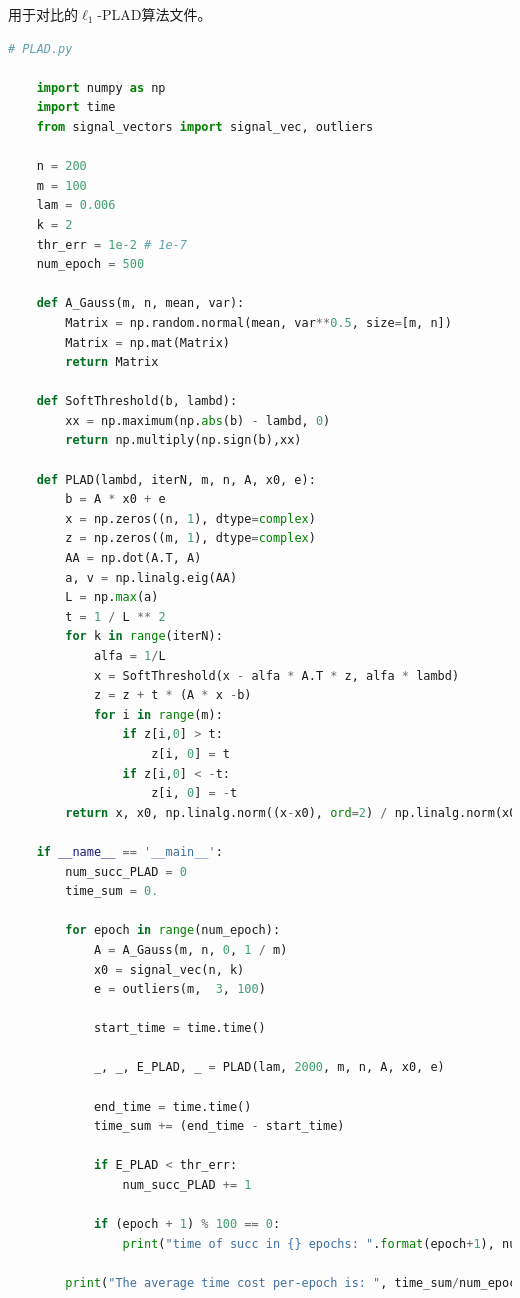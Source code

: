 \documentclass[AutoFakeBold]{LZUThesis}
\begin{document}
用于对比的$\ell_1$-PLAD算法文件。

\begin{lstlisting}[language = python]
    # PLAD.py

    import numpy as np
    import time
    from signal_vectors import signal_vec, outliers

    n = 200
    m = 100
    lam = 0.006
    k = 2
    thr_err = 1e-2 # 1e-7
    num_epoch = 500

    def A_Gauss(m, n, mean, var):
        Matrix = np.random.normal(mean, var**0.5, size=[m, n])
        Matrix = np.mat(Matrix)
        return Matrix

    def SoftThreshold(b, lambd):
        xx = np.maximum(np.abs(b) - lambd, 0)
        return np.multiply(np.sign(b),xx)

    def PLAD(lambd, iterN, m, n, A, x0, e):
        b = A * x0 + e
        x = np.zeros((n, 1), dtype=complex)
        z = np.zeros((m, 1), dtype=complex)
        AA = np.dot(A.T, A)
        a, v = np.linalg.eig(AA)
        L = np.max(a)
        t = 1 / L ** 2
        for k in range(iterN):
            alfa = 1/L
            x = SoftThreshold(x - alfa * A.T * z, alfa * lambd)
            z = z + t * (A * x -b)
            for i in range(m):
                if z[i,0] > t:
                    z[i, 0] = t
                if z[i,0] < -t:
                    z[i, 0] = -t
        return x, x0, np.linalg.norm((x-x0), ord=2) / np.linalg.norm(x0, ord=2), max(np.abs(A.T*e))

    if __name__ == '__main__':
        num_succ_PLAD = 0
        time_sum = 0.

        for epoch in range(num_epoch):
            A = A_Gauss(m, n, 0, 1 / m)
            x0 = signal_vec(n, k)
            e = outliers(m,  3, 100)

            start_time = time.time()

            _, _, E_PLAD, _ = PLAD(lam, 2000, m, n, A, x0, e)

            end_time = time.time()
            time_sum += (end_time - start_time)

            if E_PLAD < thr_err:
                num_succ_PLAD += 1

            if (epoch + 1) % 100 == 0:
                print("time of succ in {} epochs: ".format(epoch+1), num_succ_PLAD)

        print("The average time cost per-epoch is: ", time_sum/num_epoch)
\end{lstlisting}
\end{document}
